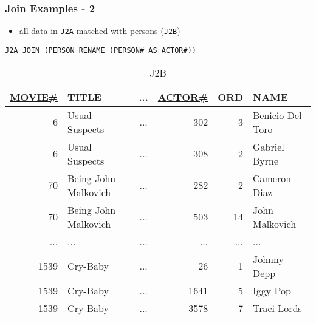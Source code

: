 \documentclass[dvipsnames]{beamer}
\theoremstyle{plain}
\begin{document}
\begin{frame}[fragile]
  \frametitle{Join Examples - 2}

  \begin{example}
    \begin{itemize}
      \item all data in \texttt{J2A} matched with persons (\texttt{J2B})
    \end{itemize}

    \begin{lstlisting}
J2A JOIN (PERSON RENAME (PERSON# AS ACTOR#))
    \end{lstlisting}

    \pause
    \vspace{-10pt}
    \begin{tiny}
    \begin{table}
      \caption{J2B}
      \begin{tabular}{|r|l|c|r|r|l|}\hline
\underline{MOVIE\#} & TITLE & ... & \underline{ACTOR\#} & ORD & NAME\\[2pt]\hline\hline
   6 & Usual Suspects       & ... &     302 &   3 & Benicio Del Toro\\\hline
   6 & Usual Suspects       & ... &     308 &   2 & Gabriel Byrne   \\\hline
  70 & Being John Malkovich & ... &     282 &   2 & Cameron Diaz    \\\hline
  70 & Being John Malkovich & ... &     503 &  14 & John Malkovich  \\\hline
 ... & ...                  & ... &     ... & ... & ...             \\\hline
1539 & Cry-Baby             & ... &      26 &   1 & Johnny Depp     \\\hline
1539 & Cry-Baby             & ... &    1641 &   5 & Iggy Pop        \\\hline
1539 & Cry-Baby             & ... &    3578 &   7 & Traci Lords     \\\hline
      \end{tabular}
    \end{table}
    \end{tiny}
  \end{example}
\end{frame}
\end{document}
